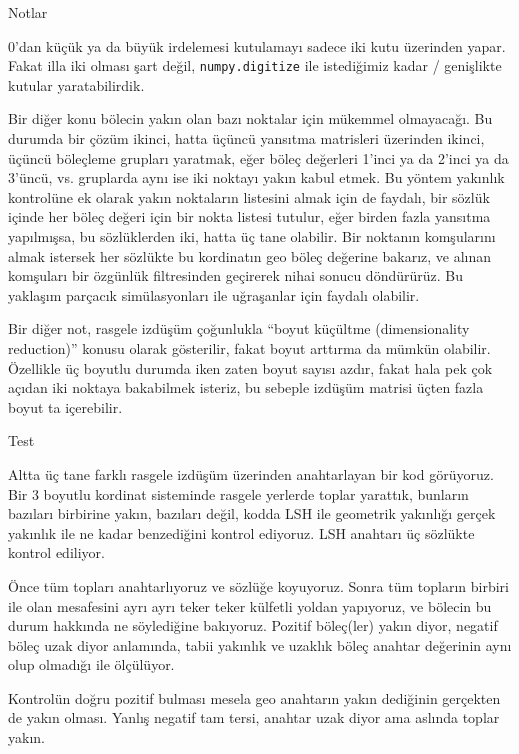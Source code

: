 \documentclass[12pt,fleqn]{article}\usepackage{../../common}
\begin{document}
Notlar

0'dan küçük ya da büyük irdelemesi kutulamayı sadece iki kutu üzerinden
yapar. Fakat illa iki olması şart değil, \verb!numpy.digitize! ile istediğimiz
kadar / genişlikte kutular yaratabilirdik.

Bir diğer konu bölecin yakın olan bazı noktalar için mükemmel olmayacağı. Bu
durumda bir çözüm ikinci, hatta üçüncü yansıtma matrisleri üzerinden ikinci,
üçüncü böleçleme grupları yaratmak, eğer böleç değerleri 1'inci ya da 2'inci ya
da 3'üncü, vs. gruplarda aynı ise iki noktayı yakın kabul etmek. Bu yöntem
yakınlık kontrolüne ek olarak yakın noktaların listesini almak için de faydalı,
bir sözlük içinde her böleç değeri için bir nokta listesi tutulur, eğer birden
fazla yansıtma yapılmışsa, bu sözlüklerden iki, hatta üç tane olabilir. Bir
noktanın komşularını almak istersek her sözlükte bu kordinatın geo böleç
değerine bakarız, ve alınan komşuları bir özgünlük filtresinden geçirerek nihai
sonucu döndürürüz. Bu yaklaşım parçacık simülasyonları ile uğraşanlar için
faydalı olabilir.

Bir diğer not, rasgele izdüşüm çoğunlukla ``boyut küçültme (dimensionality
reduction)'' konusu olarak gösterilir, fakat boyut arttırma da mümkün
olabilir. Özellikle üç boyutlu durumda iken zaten boyut sayısı azdır, fakat hala
pek çok açıdan iki noktaya bakabilmek isteriz, bu sebeple izdüşüm matrisi üçten
fazla boyut ta içerebilir.

Test

Altta üç tane farklı rasgele izdüşüm üzerinden anahtarlayan bir kod
görüyoruz. Bir 3 boyutlu kordinat sisteminde rasgele yerlerde toplar yarattık,
bunların bazıları birbirine yakın, bazıları değil, kodda LSH ile geometrik
yakınlığı gerçek yakınlık ile ne kadar benzediğini kontrol ediyoruz. LSH
anahtarı üç sözlükte kontrol ediliyor.

Önce tüm topları anahtarlıyoruz ve sözlüğe koyuyoruz. Sonra tüm topların birbiri
ile olan mesafesini ayrı ayrı teker teker külfetli yoldan yapıyoruz, ve bölecin
bu durum hakkında ne söylediğine bakıyoruz. Pozitif böleç(ler) yakın diyor,
negatif böleç uzak diyor anlamında, tabii yakınlık ve uzaklık böleç anahtar
değerinin aynı olup olmadığı ile ölçülüyor.

Kontrolün doğru pozitif bulması mesela geo anahtarın yakın dediğinin gerçekten
de yakın olması. Yanlış negatif tam tersi, anahtar uzak diyor ama aslında toplar
yakın.
\end{document}
